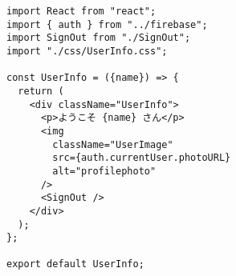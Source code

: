 \begin{verbatim}
import React from "react";
import { auth } from "../firebase";
import SignOut from "./SignOut";
import "./css/UserInfo.css";

const UserInfo = ({name}) => {
  return (
    <div className="UserInfo">
      <p>ようこそ {name} さん</p>
      <img
        className="UserImage"
        src={auth.currentUser.photoURL}
        alt="profilephoto"
      />
      <SignOut />
    </div>
  );
};

export default UserInfo;
\end{verbatim}